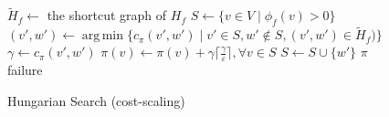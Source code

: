 \documentclass[11pt]{article}
\def\eps{\varepsilon}
\DeclareMathOperator*{\argmin}{arg\,min}
\def\fsupply{\phi}
\theoremstyle{plain}
\numberwithin{figure}{section}
\begin{document}
\begin{figure*}
\centering
\begin{minipage}{.8\linewidth}
\begin{algorithm}[H]
\caption{Hungarian Search (cost-scaling)}
\begin{algorithmic}[1]
	\State $\tilde{H}_f \gets$ the shortcut graph of $H_f$
	\State $S \gets \{v \in V \mid \fsupply_f(v) > 0\}$
	\Repeat
		\State $(v', w') \gets \argmin\{c_\pi(v', w') \mid v' \in S, w' \not\in S, (v', w') \in \tilde{H}_f)\}$
			\label{line:hs_relaxation}
		\State $\gamma \gets c_\pi(v', w')$
			\State $\pi(v) \gets \pi(v) + \gamma\lceil\frac{\gamma}{\eps}\rceil, \forall v \in S$
		\EndIf
		\State $S \gets S \cup \{w'\}$
		\If{$\fsupply_f(w') < 0$} 
			\State\Return $\pi$
		\EndIf
	\State\Return failure
\EndFunction
\end{algorithmic}
\end{algorithm}
\end{minipage}
\end{figure*}
\end{document}
